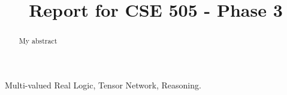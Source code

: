 \documentclass[conference]{IEEEtran}
\begin{document}
%
\title{Report for CSE 505 - Phase 3}


\author{
}

\maketitle


\begin{abstract}
My abstract
\end{abstract}

\begin{IEEEkeywords}
Multi-valued Real Logic, Tensor Network, Reasoning.
\end{IEEEkeywords}














\end{document}
